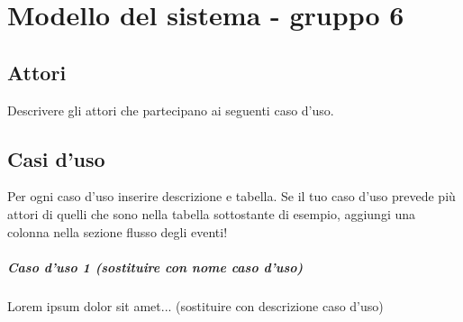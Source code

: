 
\chapter{Modello del sistema - gruppo 6}
\label{ref:modSistemaGruppo6}


\section{Attori}
Descrivere gli attori che partecipano ai seguenti caso d'uso.

\section{Casi d'uso}
Per ogni caso d'uso inserire descrizione e tabella. Se il tuo caso d'uso prevede più attori di quelli che sono nella tabella sottostante di esempio, aggiungi una colonna nella sezione flusso degli eventi!

\paragraph{Caso d'uso 1 (sostituire con nome caso d'uso) \\} 
Lorem ipsum dolor sit amet... (sostituire con descrizione caso d'uso)


